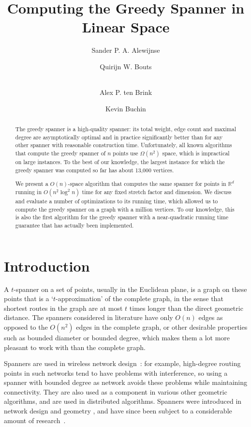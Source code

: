 \documentclass[runningheads,envcountsame,oribibl,orivec]{llncs}
\title{
 Computing the Greedy Spanner in Linear Space
}
\author{Sander P. A. Alewijnse \and
        Quirijn W. Bouts \and \\
        Alex P. ten Brink \and
        Kevin Buchin
}
\institute{
Eindhoven University of Technology, The Netherlands,
\path|{s.p.a.alewijnse,	q.w.bouts,a.p.t.brink}@student.tue.nl|,
\path|k.a.buchin@tue.nl|
}
\begin{document}
\mainmatter

\maketitle

\begin{abstract}
The greedy spanner is a high-quality spanner: its total weight, edge count and maximal degree are asymptotically optimal and in practice significantly better than for any other spanner with reasonable construction time. Unfortunately, all known algorithms that compute the greedy spanner of $n$ points use $\Omega(n^2)$ space, which is impractical on large instances. To the best of our knowledge, the largest instance for which the greedy spanner
was computed so far has about 13,000 vertices.

We present a $O(n)$-space algorithm that computes the same spanner for points in $\mathbb{R}^d$ running in $O(n^2 \log^2 n)$ time for any fixed stretch factor and dimension. We discuss and evaluate a number of optimizations to its running time, which allowed us to compute the greedy spanner on a graph with a million vertices. To our knowledge, this is also the first algorithm for the greedy spanner with a near-quadratic running time guarantee that has actually been implemented.
\end{abstract}

\section{Introduction}

A $t$-spanner on a set of points, usually in the Euclidean plane, is a graph on these points that is a `$t$-approximation' of the complete graph, in the sense that shortest routes in the graph are at most $t$ times longer than the direct geometric distance. The spanners considered in literature have only $O(n)$ edges as opposed to the $O(n^2)$ edges in the complete graph, or other desirable properties such as bounded diameter or bounded degree, which makes them a lot more pleasant to work with than the complete graph.

Spanners are used in wireless network design~\cite{GaoGHZZ05}: for example, high-degree routing points in such networks tend to have problems with interference, so using a spanner with bounded degree as network avoids these problems while maintaining connectivity. They are also used as a component in various other geometric algorithms, and are used in distributed algorithms. Spanners were introduced in network design \cite{JGT:JGT3190130114} and geometry \cite{Chew1989}, and have since been subject to a considerable amount of research~\cite{DilationandDetours,Narasimhan:2007:GSN:1208237}.
\end{document}
